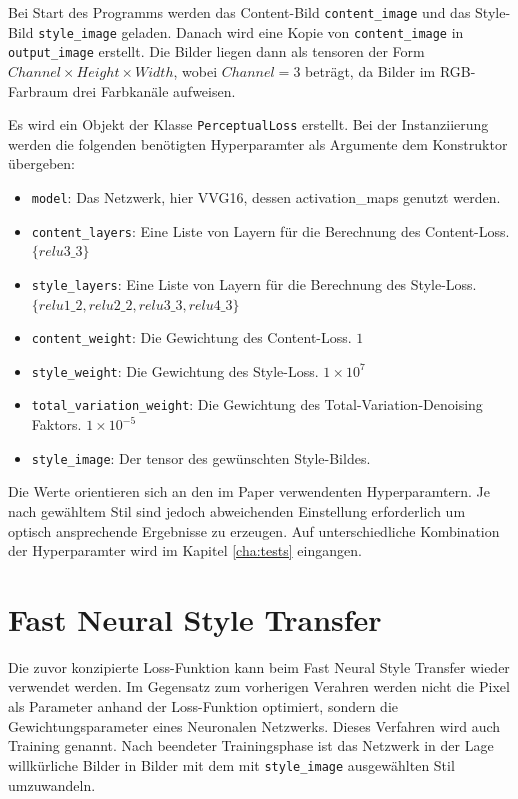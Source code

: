 Bei Start des Programms werden das Content-Bild \lstinline{content_image} und das Style-Bild \lstinline{style_image} geladen. Danach wird eine Kopie von \lstinline{content_image} in \lstinline{output_image} erstellt. Die Bilder liegen dann als \gls{tensor}en der Form $ Channel \times Height \times Width $, wobei $ Channel = 3 $ beträgt, da Bilder im RGB-Farbraum drei Farbkanäle aufweisen.

Es wird ein Objekt der Klasse \lstinline{PerceptualLoss} erstellt. Bei der Instanziierung werden die folgenden benötigten Hyperparamter als Argumente dem Konstruktor übergeben:

\begin{itemize}
	\item \lstinline{model}: Das Netzwerk, hier VVG16, dessen \gls{activation_map}s genutzt werden.
	\item \lstinline{content_layers}: Eine Liste von Layern für die Berechnung des Content-Loss.\\ $ \{ relu3\_3 \} $
	\item \lstinline{style_layers}: Eine Liste von Layern für die Berechnung des Style-Loss.\\ $ \{ relu1\_2, relu2\_2, relu3\_3, relu4\_3 \} $
	\item \lstinline{content_weight}: Die Gewichtung des Content-Loss. $ 1 $ 
	\item \lstinline{style_weight}: Die Gewichtung des Style-Loss. $ 1 \times 10^{7} $
	\item \lstinline{total_variation_weight}: Die Gewichtung des Total-Variation-Denoising Faktors. $ 1 \times 10^{-5} $
	\item \lstinline{style_image}: Der \gls{tensor} des gewünschten Style-Bildes.
\end{itemize}

Die Werte orientieren sich an den im Paper \cite{DBLP:journals/corr/JohnsonAL16} verwendenten Hyperparamtern. Je nach gewähltem Stil sind jedoch abweichenden Einstellung erforderlich um optisch ansprechende Ergebnisse zu erzeugen. Auf unterschiedliche Kombination der Hyperparamter wird im Kapitel \ref{cha:tests} eingangen.

\section{Fast Neural Style Transfer}

Die zuvor konzipierte Loss-Funktion kann beim Fast Neural Style Transfer wieder verwendet werden. 
Im Gegensatz zum vorherigen Verahren werden nicht die Pixel als Parameter anhand der Loss-Funktion optimiert, sondern die Gewichtungsparameter eines Neuronalen Netzwerks. Dieses Verfahren wird auch Training genannt. Nach beendeter Trainingsphase ist das Netzwerk in der Lage willkürliche Bilder in Bilder mit dem mit \lstinline{style_image} ausgewählten Stil umzuwandeln.


